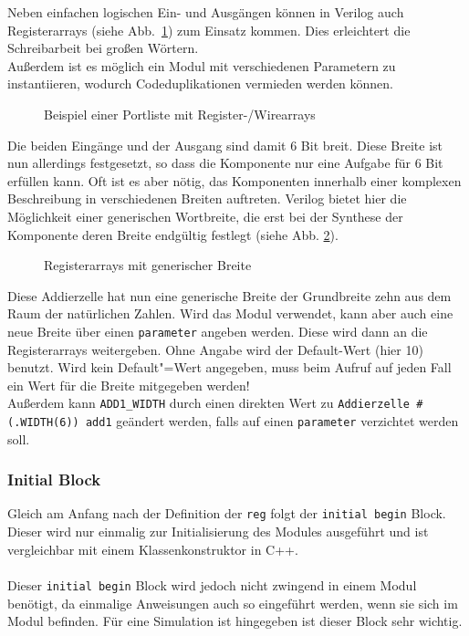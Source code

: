 Neben einfachen logischen Ein- und Ausgängen können in Verilog auch
Registerarrays (siehe Abb.~\ref{regarrays}) zum Einsatz kommen. Dies erleichtert die
Schreibarbeit bei großen Wörtern. \\
Außerdem ist es möglich ein Modul mit verschiedenen Parametern zu instantiieren, wodurch Codeduplikationen vermieden werden können.
\begin{figure}[H]
	\lstset{style=verilog-style}
	
	\caption{Beispiel einer Portliste mit Register-/Wirearrays}
	\label{regarrays}
\end{figure}
Die beiden Eingänge und der Ausgang sind damit 6 Bit breit. Diese Breite ist nun allerdings festgesetzt, so dass die Komponente nur eine Aufgabe für 6 Bit erfüllen kann. Oft ist es aber
nötig, das Komponenten innerhalb einer komplexen Beschreibung in
verschiedenen Breiten auftreten. Verilog bietet hier die Möglichkeit
einer generischen Wortbreite, die erst bei der Synthese der Komponente
deren Breite endgültig festlegt (siehe Abb. \ref{vektoren_generic}).
\begin{figure}[H]
	\lstset{style=verilog-style}
	
	\caption{Registerarrays mit generischer Breite}
	\label{vektoren_generic}
\end{figure}


Diese Addierzelle hat nun eine generische Breite der Grundbreite
zehn aus dem Raum der natürlichen Zahlen. Wird das Modul verwendet, kann aber auch eine neue Breite über einen \texttt{parameter} angeben werden. Diese wird dann an die Registerarrays weitergeben. Ohne Angabe wird der Default-Wert (hier 10) benutzt. Wird kein Default"=Wert angegeben, muss beim Aufruf auf jeden Fall ein Wert für die Breite mitgegeben werden! \\
Außerdem kann \texttt{ADD1\_WIDTH} durch einen direkten Wert zu \texttt{Addierzelle \#(.WIDTH(6)) add1} geändert werden, falls auf einen \texttt{parameter} verzichtet werden soll.

\subsubsection*{Initial Block}
Gleich am Anfang nach der Definition der \texttt{reg} folgt der \texttt{initial begin} Block. Dieser wird nur einmalig zur Initialisierung des Modules ausgeführt und ist vergleichbar mit einem Klassenkonstruktor in C++. \\ \\
Dieser \texttt{initial begin} Block wird jedoch nicht zwingend in einem Modul benötigt, da einmalige Anweisungen auch so eingeführt werden, wenn sie sich im Modul befinden. Für eine Simulation ist hingegeben ist dieser Block sehr wichtig.

